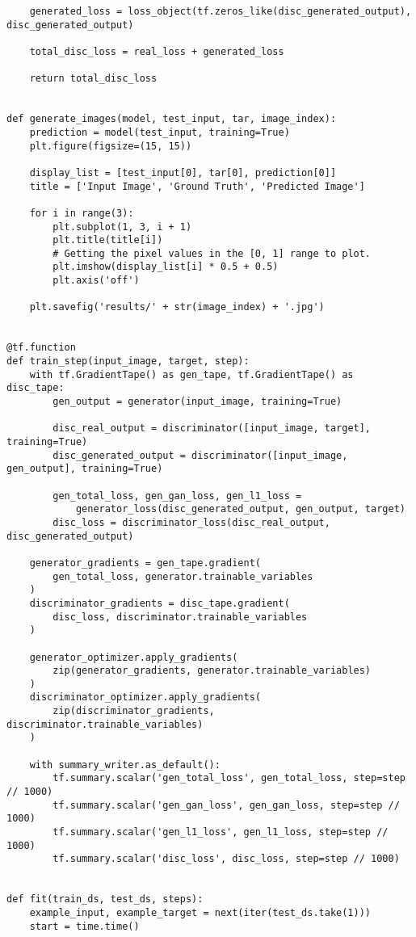 \begin{lstlisting}
    generated_loss = loss_object(tf.zeros_like(disc_generated_output), disc_generated_output)

    total_disc_loss = real_loss + generated_loss

    return total_disc_loss


def generate_images(model, test_input, tar, image_index):
    prediction = model(test_input, training=True)
    plt.figure(figsize=(15, 15))

    display_list = [test_input[0], tar[0], prediction[0]]
    title = ['Input Image', 'Ground Truth', 'Predicted Image']

    for i in range(3):
        plt.subplot(1, 3, i + 1)
        plt.title(title[i])
        # Getting the pixel values in the [0, 1] range to plot.
        plt.imshow(display_list[i] * 0.5 + 0.5)
        plt.axis('off')

    plt.savefig('results/' + str(image_index) + '.jpg')


@tf.function
def train_step(input_image, target, step):
    with tf.GradientTape() as gen_tape, tf.GradientTape() as disc_tape:
        gen_output = generator(input_image, training=True)

        disc_real_output = discriminator([input_image, target], training=True)
        disc_generated_output = discriminator([input_image, gen_output], training=True)

        gen_total_loss, gen_gan_loss, gen_l1_loss =
            generator_loss(disc_generated_output, gen_output, target)
        disc_loss = discriminator_loss(disc_real_output, disc_generated_output)

    generator_gradients = gen_tape.gradient(
        gen_total_loss, generator.trainable_variables
    )
    discriminator_gradients = disc_tape.gradient(
        disc_loss, discriminator.trainable_variables
    )

    generator_optimizer.apply_gradients(
        zip(generator_gradients, generator.trainable_variables)
    )
    discriminator_optimizer.apply_gradients(
        zip(discriminator_gradients, discriminator.trainable_variables)
    )

    with summary_writer.as_default():
        tf.summary.scalar('gen_total_loss', gen_total_loss, step=step // 1000)
        tf.summary.scalar('gen_gan_loss', gen_gan_loss, step=step // 1000)
        tf.summary.scalar('gen_l1_loss', gen_l1_loss, step=step // 1000)
        tf.summary.scalar('disc_loss', disc_loss, step=step // 1000)


def fit(train_ds, test_ds, steps):
    example_input, example_target = next(iter(test_ds.take(1)))
    start = time.time()


\end{lstlisting}
